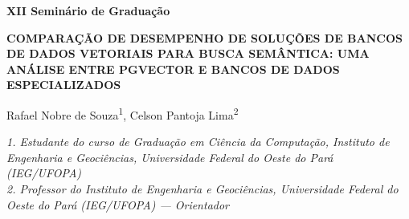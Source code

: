 \documentclass[12pt,a4paper]{article}
\newcommand{\corpo}{\fontsize{10}{12}\selectfont}
\begin{document}
\corpo

\begin{center}
{\fontsize{12}{14}\selectfont\bfseries
XII Seminário de Graduação
}

\vspace{10pt}

{\fontsize{12}{14}\selectfont\bfseries
COMPARAÇÃO DE DESEMPENHO DE SOLUÇÕES DE BANCOS DE DADOS VETORIAIS PARA BUSCA SEMÂNTICA: UMA ANÁLISE ENTRE PGVECTOR E BANCOS DE DADOS ESPECIALIZADOS
}

\vspace{10pt}

{\fontsize{12}{14}\selectfont
Rafael Nobre de Souza\textsuperscript{1}, Celson Pantoja Lima\textsuperscript{2}
}

\vspace{4pt}

{\fontsize{10}{12}\selectfont\itshape
1. Estudante do curso de Graduação em Ciência da Computação, Instituto de Engenharia e Geociências, Universidade Federal do Oeste do Pará (IEG/UFOPA)\\
2. Professor do Instituto de Engenharia e Geociências, Universidade Federal do Oeste do Pará (IEG/UFOPA) --- Orientador
}
\end{center}

\vspace{6pt}
\end{document}
